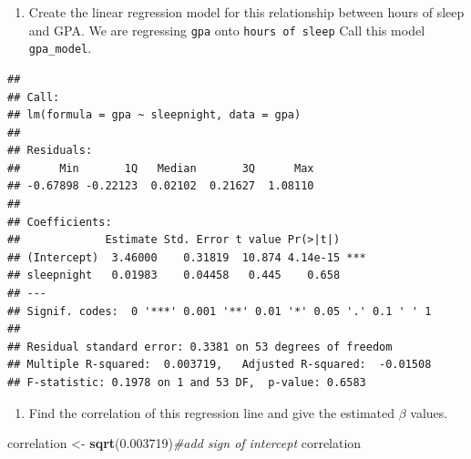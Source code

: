 \documentclass[]{article}
\newenvironment{Shaded}{\begin{snugshade}}{\end{snugshade}}
\newcommand{\CommentTok}[1]{\textcolor[rgb]{0.56,0.35,0.01}{\textit{#1}}}
\newcommand{\DataTypeTok}[1]{\textcolor[rgb]{0.13,0.29,0.53}{#1}}
\newcommand{\FloatTok}[1]{\textcolor[rgb]{0.00,0.00,0.81}{#1}}
\newcommand{\KeywordTok}[1]{\textcolor[rgb]{0.13,0.29,0.53}{\textbf{#1}}}
\newcommand{\NormalTok}[1]{#1}
\newcommand{\OperatorTok}[1]{\textcolor[rgb]{0.81,0.36,0.00}{\textbf{#1}}}
\newcommand{\StringTok}[1]{\textcolor[rgb]{0.31,0.60,0.02}{#1}}
\providecommand{\tightlist}{%
  \setlength{\itemsep}{0pt}\setlength{\parskip}{0pt}}
\begin{document}
\begin{enumerate}
\def\labelenumi{\arabic{enumi}.}
\setcounter{enumi}{2}
\tightlist
\item
  Create the linear regression model for this relationship between hours
  of sleep and GPA. We are regressing \texttt{gpa} onto
  \texttt{hours\ of\ sleep} Call this model \texttt{gpa\_model}.
\end{enumerate}

\begin{Shaded}
\end{Shaded}

\begin{verbatim}
## 
## Call:
## lm(formula = gpa ~ sleepnight, data = gpa)
## 
## Residuals:
##      Min       1Q   Median       3Q      Max 
## -0.67898 -0.22123  0.02102  0.21627  1.08110 
## 
## Coefficients:
##             Estimate Std. Error t value Pr(>|t|)    
## (Intercept)  3.46000    0.31819  10.874 4.14e-15 ***
## sleepnight   0.01983    0.04458   0.445    0.658    
## ---
## Signif. codes:  0 '***' 0.001 '**' 0.01 '*' 0.05 '.' 0.1 ' ' 1
## 
## Residual standard error: 0.3381 on 53 degrees of freedom
## Multiple R-squared:  0.003719,   Adjusted R-squared:  -0.01508 
## F-statistic: 0.1978 on 1 and 53 DF,  p-value: 0.6583
\end{verbatim}

\newpage

\begin{enumerate}
\def\labelenumi{\arabic{enumi}.}
\setcounter{enumi}{3}
\tightlist
\item
  Find the correlation of this regression line and give the estimated
  \(\beta\) values.
\end{enumerate}

\begin{Shaded}
\begin{Highlighting}[]
\NormalTok{correlation <-}\StringTok{ }\KeywordTok{sqrt}\NormalTok{(}\FloatTok{0.003719}\NormalTok{)}\CommentTok{#add sign of intercept}
\NormalTok{correlation}
\end{Highlighting}
\end{Shaded}
\end{document}
